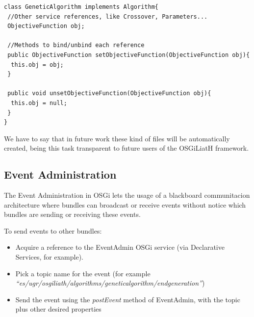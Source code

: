 \documentclass{sig-alternate}
\begin{document}
\begin{lstlisting}
class GeneticAlgorithm implements Algorithm{
 //Other service references, like Crossover, Parameters...
 ObjectiveFunction obj;
 
 //Methods to bind/unbind each reference
 public ObjectiveFunction setObjectiveFunction(ObjectiveFunction obj){
  this.obj = obj;
 }
	
 public void unsetObjectiveFunction(ObjectiveFunction obj){
  this.obj = null;
 }
}
\end{lstlisting}

We have to say that in future work these kind of files will be automatically created, being this task transparent to future users of the OSGiLiatH framework.

\subsection{Event Administration}
The Event Administration in OSGi lets the usage of a blackboard communitacion architecture where bundles can broadcast or receive events without notice which bundles are sending or receiving these events.


To send events to other bundles:
\begin{itemize}
\item Acquire a reference to the EventAdmin OSGi service (via Declarative Services, for example).
\item Pick a topic name for the event (for example {\em ``es/ugr/osgiliath/algorithms/geneticalgorithm/endgeneration''})
\item Send the event using the {\em postEvent} method of EventAdmin, with the topic plus other desired properties %
\end{itemize}
\end{document}
